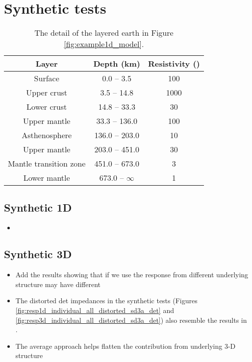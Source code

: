	\section{Synthetic tests}
\begin{table}
	\centering
	\begin{tabular}{ccc}
	\hline 
	Layer & Depth (km) & Resistivity (\Ohmm) \\ \hline
	Surface & 0.0 -- 3.5 & 100 \\
	Upper crust & 3.5 -- 14.8 & 1000 \\
	Lower crust & 14.8 -- 33.3 & 30 \\
	Upper mantle & 33.3 -- 136.0 & 100 \\
	Asthenosphere & 136.0 -- 203.0 & 10 \\
	Upper mantle & 203.0 -- 451.0 & 30 \\
	Mantle transition zone & 451.0 -- 673.0 & 3 \\
	Lower mantle & 673.0 -- $\infty$ & 1 \\ \hline
	\end{tabular}
	\caption{The detail of the layered earth in Figure \ref{fig:example1d_model}.}
	\label{tab:example1d_model}
\end{table}
\subsection{Synthetic 1D}
\begin{itemize}
	\item {}
\end{itemize}
\subsection{Synthetic 3D}
\begin{itemize}
	\item Add the results showing that if we use the response from different underlying structure may have different
	\item The distorted det impedances in the synthetic tests (Figures \ref{fig:resp1d_individual_all_distorted_sd3a_det} and \ref{fig:resp3d_individual_all_distorted_sd3a_det}) also resemble the results in  \citet{berdichevsky1980a}.	
	
\end{itemize}

\begin{itemize}
	\item The average approach helps flatten the contribution from underlying 3-D structure
\end{itemize}
